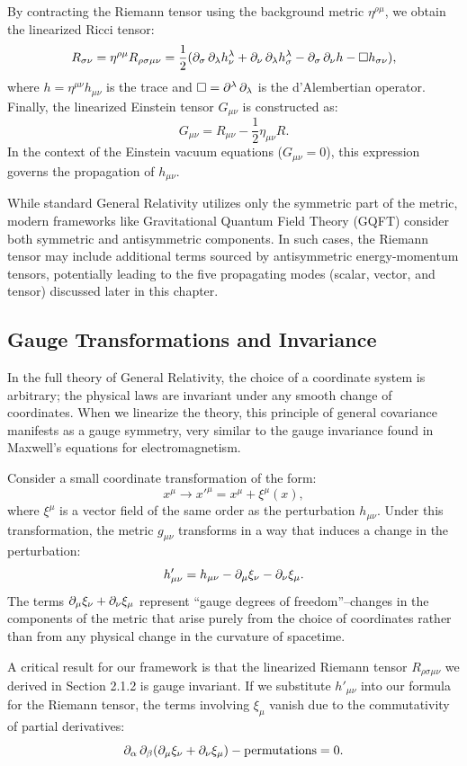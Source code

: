 By contracting the Riemann tensor using the background metric $\eta^{\rho\mu}$, we obtain the linearized Ricci tensor:
\[%
  R_{\sigma\nu} = \eta^{\rho\mu}R_{\rho\sigma\mu\nu} = \frac{1}{2}(\pd{\sigma}\pd{\lambda}h^{\lambda}_{\nu} + \pd{\nu}\pd{\lambda}h^{\lambda}_{\sigma} - \pd{\sigma}\pd{\nu}h - \Box h_{\sigma\nu})
,\]%
where $h = \eta^{\mu\nu}h_{\mu\nu}$ is the trace and $\Box = \partial^{\lambda}\pd{\lambda}$ is the d'Alembertian operator. Finally, the linearized Einstein tensor $G_{\mu\nu}$ is constructed as:
\[%
  G_{\mu\nu} = R_{\mu\nu} - \frac{1}{2}\eta_{\mu\nu}R
.\]%
In the context of the Einstein vacuum equations ($G_{\mu\nu} = 0$), this expression governs the propagation of $h_{\mu\nu}$.

While standard General Relativity utilizes only the symmetric part of the metric, modern frameworks like Gravitational Quantum Field Theory (GQFT) consider both symmetric and antisymmetric components. In such cases, the Riemann tensor may include additional terms sourced by antisymmetric energy-momentum tensors, potentially leading to the five propagating modes (scalar, vector, and tensor) discussed later in this chapter.

\subsection{Gauge Transformations and Invariance}
\label{sub_sec:gauge_transformations_and_invariance}

In the full theory of General Relativity, the choice of a coordinate system is arbitrary; the physical laws are invariant under any smooth change of coordinates. When we linearize the theory, this principle of general covariance manifests as a gauge symmetry, very similar to the gauge invariance found in Maxwell's equations for electromagnetism.

Consider a small coordinate transformation of the form:
\[%
  x^{\mu} \to {x'}^{\mu} = x^{\mu} + \xi^{\mu}(x)
,\]%
where $\xi^{\mu}$ is a vector field of the same order as the perturbation $h_{\mu\nu}$. Under this transformation, the metric $g_{\mu\nu}$ transforms in a way that induces a change in the perturbation:
\[%
  h'_{\mu\nu} = h_{\mu\nu} - \pd{\mu}\xi_{\nu} - \pd{\nu}\xi_{\mu}
.\]%
The terms $\pd{\mu}\xi_{\nu} + \pd{\nu}\xi_{\mu}$ represent ``gauge degrees of freedom''--changes in the components of the metric that arise purely from the choice of coordinates rather than from any physical change in the curvature of spacetime.

A critical result for our framework is that the linearized Riemann tensor $R_{\rho\sigma\mu\nu}$ we derived in Section 2.1.2 is gauge invariant. If we substitute $h'_{\mu\nu}$ into our formula for the Riemann tensor, the terms involving $\xi_{\mu}$ vanish due to the commutativity of partial derivatives:
\[%
  \pd{\alpha}\pd{\beta}(\pd{\mu}\xi_{\nu} + \pd{\nu}\xi_{\mu}) - \text{permutations} = 0
.\]%

